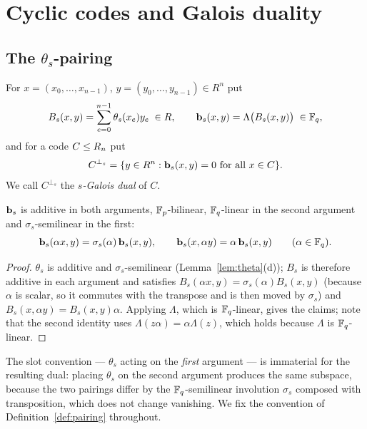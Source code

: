 \section{Cyclic codes and Galois duality}
\label{sec:cyclic}

\subsection{The $\theta_s$-pairing}\label{subsec:pairing}

\begin{definition}\label{def:pairing}
For $x=(x_0,\dots,x_{n-1})$, $y=(y_0,\dots,y_{n-1})\in R^n$ put
\[
  B_s(x,y)=\sum_{e=0}^{n-1}\theta_s(x_e)y_e\;\in R,
  \qquad
  \mathbf b_s(x,y)=\Lambda\bigl(B_s(x,y)\bigr)\;\in\mathbb F_q ,
\]
and for a code $C\le R_n$ put
\[
  C^{\perp_s}=\{y\in R^n:\mathbf b_s(x,y)=0\ \text{for all }x\in C\}.
\]
We call $C^{\perp_s}$ the \emph{$s$-Galois dual} of $C$.
\end{definition}

\begin{lemma}[sesquilinearity]\label{lem:sesqui}
$\mathbf b_s$ is additive in both arguments, $\mathbb F_p$-bilinear,
$\mathbb F_q$-linear in the second argument and $\sigma_s$-semilinear in the first:
\[
  \mathbf b_s(\alpha x,y)=\sigma_s(\alpha)\,\mathbf b_s(x,y),\qquad
  \mathbf b_s(x,\alpha y)=\alpha\,\mathbf b_s(x,y)\qquad(\alpha\in\mathbb F_q).
\]
\end{lemma}

\begin{proof}
$\theta_s$ is additive and $\sigma_s$-semilinear
(Lemma~\ref{lem:theta}(d)); $B_s$ is therefore additive in each argument and
satisfies $B_s(\alpha x,y)=\sigma_s(\alpha)B_s(x,y)$ (because $\alpha$ is
scalar, so it commutes with the transpose and is then moved by $\sigma_s$) and
$B_s(x,\alpha y)=B_s(x,y)\alpha$. Applying $\Lambda$, which is $\mathbb F_q$-linear,
gives the claims; note that the second identity uses
$\Lambda(z\alpha)=\alpha\Lambda(z)$, which holds because $\Lambda$ is
$\mathbb F_q$-linear.
\end{proof}

The slot convention --- $\theta_s$ acting on the \emph{first} argument --- is
immaterial for the resulting dual: placing $\theta_s$ on the second argument
produces the same subspace, because the two pairings differ by the
$\mathbb F_q$-semilinear involution $\sigma_s$ composed with transposition, which does
not change vanishing. We fix the convention of
Definition~\ref{def:pairing} throughout.

